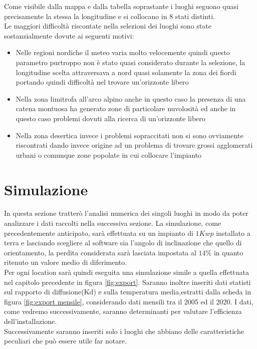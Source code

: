 Come visibile dalla mappa e dalla tabella soprastante i luoghi seguono quasi precisamente la stessa la longitudine e si collocano in 8 stati distinti.\\
Le maggiori difficoltà riscontate nella selezioni dei luoghi sono state sostanzialmente dovute ai seguenti motivi:
\begin{itemize}
    \item Nelle regioni nordiche il meteo varia molto velocemente quindi questo parametro purtroppo non è stato quasi considerato durante la selezione, la longitudine scelta attraversava a nord quasi solamente la zona dei fiordi portando quindi difficoltà nel trovare un'orizzonte libero
    \item Nella zona limitrofa all'arco alpino anche in questo caso la presenza di una catena montuosa ha generato zone di particolare nuvolosità ed anche in questo caso problemi dovuti alla ricerca di un'orizzonte libero
    \item Nella zona desertica invece i problemi sopraccitati non si sono ovviamente riscontrati dando invece origine ad un problema di trovare grossi agglomerati urbani o comunque zone popolate in cui collocare l'impianto
\end{itemize}
\noindent
\section{Simulazione}
In questa sezione tratterò l'analisi numerica dei singoli luoghi in modo da poter analizzare i dati raccolti nella successiva sezione.
La simulazione, come precedentemente anticipato, sarà effettuata su un impianto di \large{$1Kwp$} installato a terra e lasciando scegliere al software sia l'angolo di inclinazione che quello di orientamento, la perdita considerata sarà lasciata impostata al \large{$14\%$} in quanto ritenuto un valore medio di diferimento.\\
Per ogni location sarà quindi eseguita una simulazione simile a quella effettuata nel capitolo precedente in figura \ref{fig:export}.
Saranno inoltre inseriti dati statisti sul rapporto di diffusione(Kd) e sulla temperatura media,estratti dalla scheda in figura \ref{fig:export mensile}, considerando dati mensili tra il 2005 ed il 2020. I dati, come vedremo successivamente, saranno determinanti per valutare l'efficienza dell'installazione.\\
Successivamente saranno inseriti solo i luoghi che abbiano delle caratteristiche peculiari che può essere utile far notare.\\
\newpage
